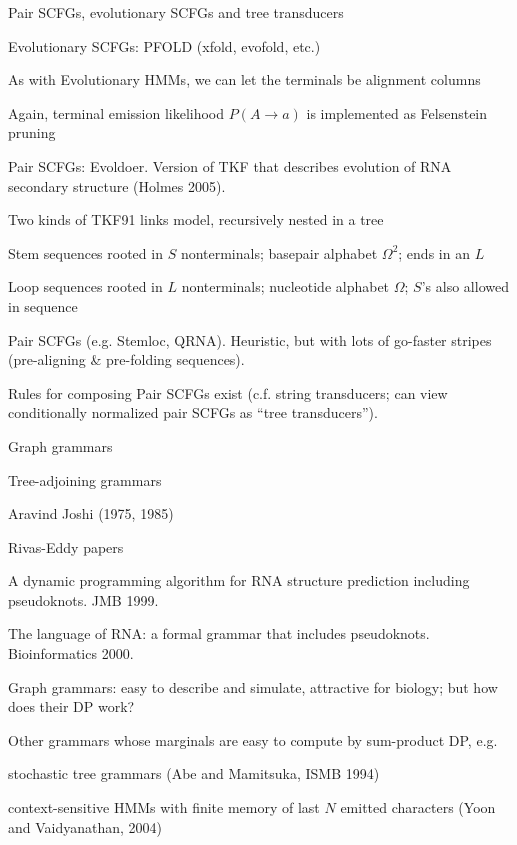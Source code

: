 \documentclass{beamer}
\begin{document}
\begin{frame}{Pair SCFGs, evolutionary SCFGs and tree transducers}

\itemb
\item Evolutionary SCFGs: PFOLD (xfold, evofold, etc.)
 \itemb
 \item As with Evolutionary HMMs, we can let the terminals be alignment columns
 \item Again, terminal emission likelihood $P(A \to a)$ is implemented as Felsenstein pruning
 \iteme
\item Pair SCFGs: Evoldoer. Version of TKF that describes evolution of RNA secondary structure (Holmes 2005).
 \itemb
 \item Two kinds of TKF91 links model, recursively nested in a tree
 \item Stem sequences rooted in $S$ nonterminals; basepair alphabet $\Omega^2$; ends in an $L$
 \item Loop sequences rooted in $L$ nonterminals; nucleotide alphabet $\Omega$; $S$'s also allowed in sequence
 \iteme
\item Pair SCFGs (e.g. Stemloc, QRNA). Heuristic, but with lots of go-faster stripes (pre-aligning \& pre-folding sequences).
\item Rules for composing Pair SCFGs exist (c.f. string transducers; can view conditionally normalized pair SCFGs as ``tree transducers'').
\iteme

\end{frame}

\begin{frame}{Graph grammars}

\itemb
\item Tree-adjoining grammars
 \itemb
 \item Aravind Joshi (1975, 1985)
 \iteme
\item Rivas-Eddy papers
 \itemb
 \item A dynamic programming algorithm for RNA structure prediction including pseudoknots. JMB 1999.
 \item The language of RNA: a formal grammar that includes pseudoknots. Bioinformatics 2000.
 \iteme
\item Graph grammars: easy to describe and simulate, attractive for biology; but how does their DP work?
\item Other grammars whose marginals are easy to compute by sum-product DP, e.g.
 \itemb
 \item stochastic tree grammars (Abe and Mamitsuka, ISMB 1994)
 \item context-sensitive HMMs with finite memory of last $N$ emitted characters (Yoon and Vaidyanathan, 2004)
 \iteme
\iteme

\end{frame}
\end{document}
